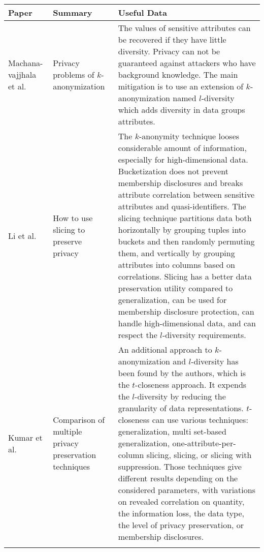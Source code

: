\begin{small}
\begin{landscape}
	\begin{tabularx}{\linewidth}{p{1.5cm}|p{3cm}X}
		\toprule[0.8mm]
		\textbf{Paper} & \textbf{Summary} & \textbf{Useful Data} \\
		\midrule[0.8mm] %
		Machana- vajjhala et al. \cite{machanavajjhala_l-diversity_2006} & Privacy problems of $k$-anonymization & The values of sensitive attributes can be recovered if they have little diversity. Privacy can not be guaranteed against attackers who have background knowledge. The main mitigation is to use an extension of $k$-anonymization named $l$-diversity which adds diversity in data groups attributes. \\
		\midrule
		Li et al. \cite{li_slicing_2012} & How to use slicing to preserve privacy & The $k$-anonymity technique looses considerable amount of information, especially for high-dimensional data. Bucketization does not prevent membership disclosures and breaks attribute correlation between sensitive attributes and quasi-identifiers. The slicing technique partitions data both horizontally by grouping tuples into buckets and then randomly permuting them, and vertically by grouping attributes into columns based on correlations. Slicing has a better data preservation utility compared to generalization, can be used for membership disclosure protection, can handle high-dimensional data, and can respect the $l$-diversity requirements. \\ 
		\midrule
		Kumar et al. \cite{kumar_comparative_2018} & Comparison of multiple privacy preservation techniques & An additional approach to $k$-anonymization and $l$-diversity has been found by the authors, which is the $t$-closeness approach. It expends the $l$-diversity by reducing the granularity of data representations. $t$-closeness can use various techniques: generalization, multi set-based generalization, one-attribute-per-column slicing, slicing, or slicing with suppression. Those techniques give different results depending on the considered parameters, with variations on revealed correlation on quantity, the information loss, the data type, the level of privacy preservation, or membership disclosures. \\
		\bottomrule[0.8mm]
		\caption{Anonymization techniques comparison}
		\label{table:state_review_results_anonymization}
	\end{tabularx} %


	\newpage


\end{landscape}
\end{small}

